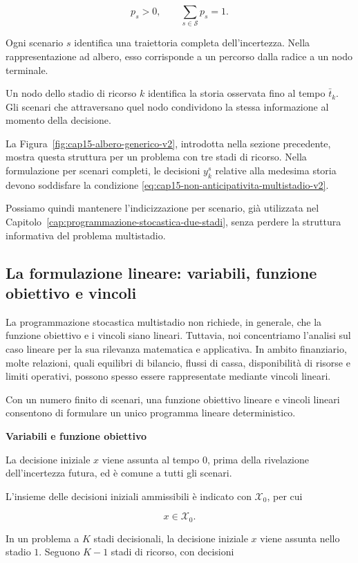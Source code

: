 \[
p_s>0,
\qquad
\sum_{s\in\mathcal S}p_s=1.
\]

Ogni scenario $s$ identifica una traiettoria
completa dell'incertezza. Nella rappresentazione
ad albero, esso corrisponde a un percorso
dalla radice a un nodo terminale.

Un nodo dello stadio di ricorso $k$
identifica la storia osservata fino
al tempo $\bar t_k$. Gli scenari
che attraversano quel nodo
condividono la stessa informazione
al momento della decisione.

La Figura~\ref{fig:cap15-albero-generico-v2},
introdotta nella sezione precedente,
mostra questa struttura per un problema
con tre stadi di ricorso. Nella formulazione
per scenari completi, le decisioni
$y_k^s$ relative alla medesima storia
devono soddisfare la condizione
\eqref{eq:cap15-non-anticipativita-multistadio-v2}.

Possiamo quindi mantenere l'indicizzazione
per scenario, gi\`a utilizzata
nel Capitolo~\ref{cap:programmazione-stocastica-due-stadi},
senza perdere la struttura informativa
del problema multistadio.


\subsection{La formulazione lineare: variabili,
funzione obiettivo e vincoli}

La programmazione stocastica multistadio
non richiede, in generale, che la funzione
obiettivo e i vincoli siano lineari.
Tuttavia, noi concentriamo l'analisi sul caso lineare
per la sua rilevanza matematica e applicativa. In ambito finanziario, molte relazioni, quali
equilibri di bilancio, flussi di cassa,
disponibilit\`a di risorse e limiti
operativi, possono spesso essere
rappresentate mediante vincoli lineari.

Con un numero finito di scenari,
una funzione obiettivo lineare e
vincoli lineari consentono di formulare
un unico programma lineare deterministico.


\medskip

\noindent
\textbf{Variabili e funzione obiettivo}

La decisione iniziale $x$ viene assunta
al tempo $0$, prima della rivelazione
dell'incertezza futura, ed \`e
comune a tutti gli scenari.

L'insieme delle decisioni iniziali
ammissibili \`e indicato con
$\mathcal X_0$, per cui

\[
x\in\mathcal X_0.
\]

In un problema a $K$ stadi decisionali, la decisione iniziale
$x$ viene assunta nello stadio $1$. Seguono $K-1$ stadi
di ricorso, con decisioni

